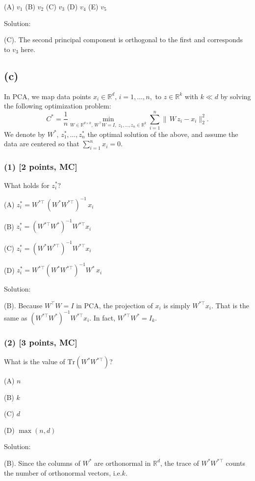 \documentclass[twocolumn]{article}
\begin{document}
\begin{spacing}{1}
(A) \(v_1\) \quad (B) \(v_2\) \quad (C) \(v_3\) \quad (D) \(v_4\) \quad (E) \(v_5\)

Solution:

(C). The second principal component is orthogonal to the first and corresponds to \(v_3\) here.

\subsection*{(c)}
In PCA, we map data points \(x_i \in \mathbb{R}^d,\, i=1,\ldots,n,\) to \(z \in \mathbb{R}^k\) with \(k \ll d\) by solving the following optimization problem:
\[
C^* 
= \frac{1}{n} 
\min_{W \in \mathbb{R}^{d\times k},\,W^\top W = I,\;z_1,\ldots,z_n \in \mathbb{R}^k}
\sum_{i=1}^{n} \|\,W\,z_i - x_i\|_2^2.
\]
We denote by \(W^*,\,z_1^*,\ldots,z_n^*\) the optimal solution of the above, and assume the data are centered so that \(\sum_{i=1}^n x_i = 0\).

\subsubsection*{(1) [2 points, MC]}
What holds for \(z_i^*\)?

(A) \(z_i^* = W^{*\top}\,(W^* W^{*\top})^{-1}\,x_i\)

(B) \(z_i^* = (W^{*\top} W^*_{} )^{-1} W^{*\top} x_i\)

(C) \(z_i^* = (W^* W^{*\top})^{-1} W^{*\top} x_i\)

(D) \(z_i^* = W^{*\top} (W^* W^{*\top})^{-1} W^*_{}\,x_i\)

Solution:

(B). Because \(W^{\top} W=I\) in PCA, the projection of \(x_i\) is simply \(W^{*\top} x_i\). That is the same as \((W^{*\top} W^*_{} )^{-1} W^{*\top} x_i\). In fact, \(W^{*\top} W^*_{} = I_k\).

\subsubsection*{(2) [3 points, MC]}
What is the value of \(\mathrm{Tr}(W^* W^{*\top})\)?

(A) \(n\)

(B) \(k\)

(C) \(d\)

(D) \(\max(n,d)\)

Solution:

(B). Since the columns of \(W^*\) are orthonormal in \(\mathbb{R}^d\), the trace of \(W^* W^{*\top}\) counts the number of orthonormal vectors, i.e.\(k\).


\end{spacing}
\end{document}
